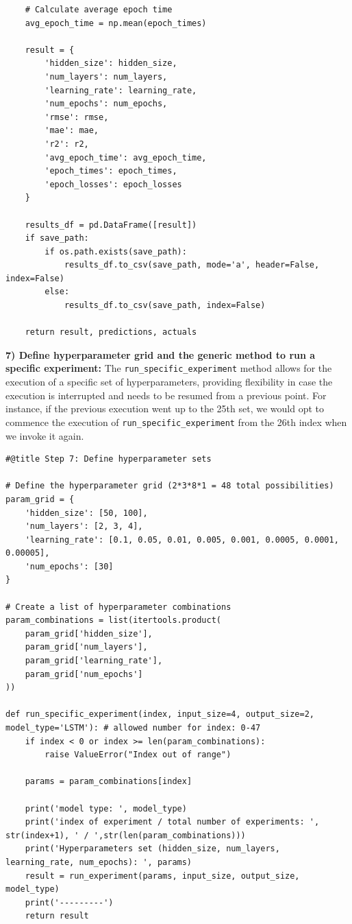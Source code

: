 \documentclass[journal,onecolumn]{IEEEtran}
\begin{document}
{\begin{appendices}
\begin{verbatim}
    # Calculate average epoch time
    avg_epoch_time = np.mean(epoch_times)

    result = {
        'hidden_size': hidden_size,
        'num_layers': num_layers,
        'learning_rate': learning_rate,
        'num_epochs': num_epochs,
        'rmse': rmse,
        'mae': mae,
        'r2': r2,
        'avg_epoch_time': avg_epoch_time,
        'epoch_times': epoch_times,
        'epoch_losses': epoch_losses
    }

    results_df = pd.DataFrame([result])
    if save_path:
        if os.path.exists(save_path):
            results_df.to_csv(save_path, mode='a', header=False, index=False)
        else:
            results_df.to_csv(save_path, index=False)

    return result, predictions, actuals
\end{verbatim}

\textbf{7) Define hyperparameter grid and the generic method to run a specific experiment: } The \texttt{run\_specific\_experiment} method allows for the execution of a specific set of hyperparameters, providing flexibility in case the execution is interrupted and needs to be resumed from a previous point. For instance, if the previous execution went up to the 25th set, we would opt to commence the execution of \texttt{run\_specific\_experiment} from the 26th index when we invoke it again.
\begin{verbatim}
#@title Step 7: Define hyperparameter sets

# Define the hyperparameter grid (2*3*8*1 = 48 total possibilities)
param_grid = {
    'hidden_size': [50, 100],
    'num_layers': [2, 3, 4],
    'learning_rate': [0.1, 0.05, 0.01, 0.005, 0.001, 0.0005, 0.0001, 0.00005],
    'num_epochs': [30] 
}

# Create a list of hyperparameter combinations
param_combinations = list(itertools.product(
    param_grid['hidden_size'],
    param_grid['num_layers'],
    param_grid['learning_rate'],
    param_grid['num_epochs']
))

def run_specific_experiment(index, input_size=4, output_size=2, model_type='LSTM'): # allowed number for index: 0-47
    if index < 0 or index >= len(param_combinations):
        raise ValueError("Index out of range")
    
    params = param_combinations[index]

    print('model type: ', model_type)
    print('index of experiment / total number of experiments: ', str(index+1), ' / ',str(len(param_combinations)))
    print('Hyperparameters set (hidden_size, num_layers, learning_rate, num_epochs): ', params)
    result = run_experiment(params, input_size, output_size, model_type)
    print('---------')    
    return result
\end{verbatim}


\end{appendices}}
\end{document}
